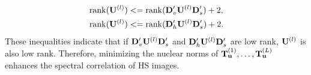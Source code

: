 \begin{align}
	& \operatorname{rank}(\mathbf{U}^{(l)}) <= \operatorname{rank}(\mathbf{D}_{v}^{\prime} \mathbf{U}^{(l)} \mathbf{D}_{s}^{\prime}) + 2,
	\nonumber \\
	& \operatorname{rank}(\mathbf{U}^{(l)}) <= \operatorname{rank}(\mathbf{D}_{h}^{\prime} \mathbf{U}^{(l)} \mathbf{D}_{s}^{\prime}) + 2.
\end{align}
These inequalities indicate that if $\mathbf{D}_{v}^{\prime} \mathbf{U}^{(l)} \mathbf{D}_{s}^{\prime}$ and $\mathbf{D}_{h}^{\prime} \mathbf{U}^{(l)} \mathbf{D}_{s}^{\prime}$ are low rank, $\mathbf{U}^{(l)}$ is also low rank.
Therefore, minimizing the nuclear norms of $\mathbf{T}_{\mathbf{u}}^{(1)}, \ldots, \mathbf{T}_{\mathbf{u}}^{(L)}$ enhances the spectral correlation of HS images.




